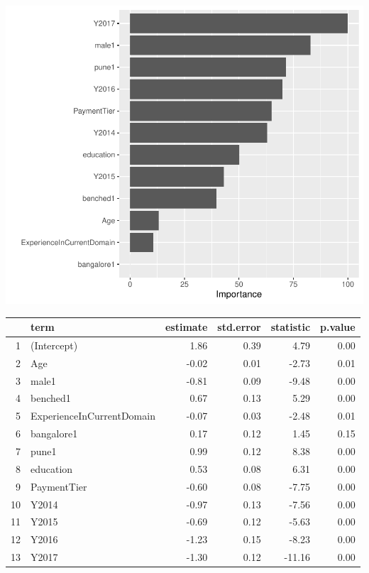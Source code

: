 \documentclass[11pt,preprint, authoryear]{elsarticle}
\let\origtable\table
\let\endorigtable\endtable
\renewenvironment{table}[1][2] {
    \expandafter\origtable\expandafter[H]
} {
    \endorigtable
}
\numberwithin{equation}{section}
\numberwithin{figure}{section}
\numberwithin{table}{section}
\begin{document}
\includegraphics{Final_project_files/figure-latex/unnamed-chunk-7-1.pdf}

\begin{table}[H]
\centering
\begin{tabular}{rlrrrr}
  \hline
 & term & estimate & std.error & statistic & p.value \\ 
  \hline
1 & (Intercept) & 1.86 & 0.39 & 4.79 & 0.00 \\ 
  2 & Age & -0.02 & 0.01 & -2.73 & 0.01 \\ 
  3 & male1 & -0.81 & 0.09 & -9.48 & 0.00 \\ 
  4 & benched1 & 0.67 & 0.13 & 5.29 & 0.00 \\ 
  5 & ExperienceInCurrentDomain & -0.07 & 0.03 & -2.48 & 0.01 \\ 
  6 & bangalore1 & 0.17 & 0.12 & 1.45 & 0.15 \\ 
  7 & pune1 & 0.99 & 0.12 & 8.38 & 0.00 \\ 
  8 & education & 0.53 & 0.08 & 6.31 & 0.00 \\ 
  9 & PaymentTier & -0.60 & 0.08 & -7.75 & 0.00 \\ 
  10 & Y2014 & -0.97 & 0.13 & -7.56 & 0.00 \\ 
  11 & Y2015 & -0.69 & 0.12 & -5.63 & 0.00 \\ 
  12 & Y2016 & -1.23 & 0.15 & -8.23 & 0.00 \\ 
  13 & Y2017 & -1.30 & 0.12 & -11.16 & 0.00 \\ 
   \hline
\end{tabular}
\caption{Logistic Regression Results \label{tab1}} 
\end{table}
\end{document}
